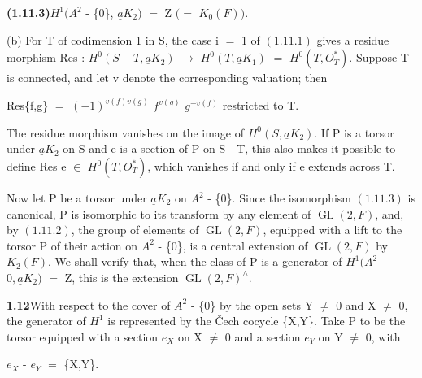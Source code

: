 \documentclass[10pt,a4paper]{article}
\begin{document}
\clearpage
{}
\label{d035-physical-012}
\par\noindent\textbf{(1.11.3)}\quad $H^1(A^2$ - \{0\}, $\underline{a}K_2)$ $=$ Z $(=$ $K_0(F))$.\par
\par (b) For T of codimension 1 in S, the case i $=$ 1 of $(1.11.1)$ gives a residue morphism Res : $H^0(S-T,\underline{a}K_2)$ $\to{}$ $H^0(T,\underline{a}K_1)$ $=$ $H^0(T,O_T^*)$. Suppose T is connected, and let v denote the corresponding valuation; then\par
\par\smallskip\begin{center}\begin{minipage}{0.96\textwidth}\centering
Res\{f,g\} $=$ $(-1)^{v(f)v(g)}$ $f^{v(g)}$ $g^{-v(f)}$ restricted to T.
\end{minipage}\end{center}\smallskip
\par The residue morphism vanishes on the image of $H^0(S,\underline{a}K_2)$. If P is a torsor under $\underline{a}K_2$ on S and e is a section of P on S - T, this also makes it possible to define Res e $\in{}$ $H^0(T,O_T^*)$, which vanishes if and only if e extends across T.\par
\par Now let P be a torsor under $\underline{a}K_2$ on $A^2$ - \{0\}. Since the isomorphism $(1.11.3)$ is canonical, P is isomorphic to its transform by any element of $\operatorname{GL}(2,F)$, and, by $(1.11.2)$, the group of elements of $\operatorname{GL}(2,F)$, equipped with a lift to the torsor P of their action on $A^2$ - \{0\}, is a central extension of $\operatorname{GL}(2,F)$ by $K_2(F)$. We shall verify that, when the class of P is a generator of $H^1(A^2$ - ${0},\underline{a}K_2)$ $=$ Z, this is the extension $\operatorname{GL}(2,F)^\wedge{}$.\par
\par\noindent\textbf{1.12}\quad With respect to the cover of $A^2$ - \{0\} by the open sets Y $\ne{}$ 0 and X $\ne{}$ 0, the generator of $H^1$ is represented by the Čech cocycle \{X,Y\}. Take P to be the torsor equipped with a section $e_X$ on X $\ne{}$ 0 and a section $e_Y$ on Y $\ne{}$ 0, with\par
\par\smallskip\begin{center}\begin{minipage}{0.96\textwidth}\centering
$e_X$ - $e_Y$ $=$ \{X,Y\}.
\end{minipage}\end{center}\smallskip
\end{document}
